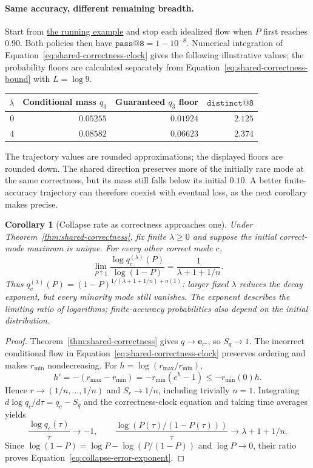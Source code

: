 \documentclass{article}
\newcommand{\1}{\mathbf 1}
\newtheorem{corollary}[lemma]{Corollary}
\theoremstyle{remark}
\theoremstyle{definition}
\theoremstyle{plain}
\begin{document}
\paragraph{Same accuracy, different remaining breadth.}
Start from \hyperref[ex:theory-running]{the running example} and stop each idealized flow when
$P$ first reaches $0.90$. Both policies then have
$\texttt{pass@8}=1-10^{-8}$. Numerical integration of
Equation~\eqref{eq:shared-correctness-clock} gives the following illustrative
values; the probability floors are calculated separately from
Equation~\eqref{eq:shared-correctness-bound} with $L=\log9$.
\begin{center}
\begin{tabular}{@{}rrrr@{}}
\toprule
$\lambda$ & Conditional mass $q_3$ & Guaranteed $q_3$ floor & $\texttt{distinct@8}$ \\
\midrule
$0$ & $0.05255$ & $0.01924$ & $2.125$ \\
$4$ & $0.08582$ & $0.06623$ & $2.374$ \\
\bottomrule
\end{tabular}
\end{center}
The trajectory values are rounded approximations; the displayed floors are
rounded down. The shared direction preserves more of the initially rare mode
at the same correctness, but its mass still falls below its initial $0.10$.
A better finite-accuracy trajectory can therefore coexist with eventual loss,
as the next corollary makes precise.

\begin{corollary}[Collapse rate as correctness approaches one]
\label{cor:collapse-error-rate}
Under Theorem~\ref{thm:shared-correctness}, fix finite $\lambda\ge0$
and suppose the initial correct-mode maximum is unique. For every other
correct mode $c$,
\begin{equation}
 \lim_{P\uparrow1}\frac{\log q_c^{(\lambda)}(P)}{\log(1-P)}
 =\frac{1}{\lambda+1+1/n}.
 \label{eq:collapse-error-exponent}
\end{equation}
Thus $q_c^{(\lambda)}(P)=(1-P)^{1/(\lambda+1+1/n)+o(1)}$:
larger fixed $\lambda$ reduces the decay exponent, but every minority mode
still vanishes. The exponent describes the limiting ratio of logarithms;
finite-accuracy probabilities also depend on the initial distribution.
\end{corollary}

\begin{proof}
Theorem~\ref{thm:shared-correctness} gives $q\to\mathbf e_{c^\star}$,
so $S_q\to1$. The incorrect conditional flow in
Equation~\eqref{eq:shared-correctness-clock} preserves ordering and makes
$r_{\min}$ nondecreasing. For $h=\log(r_{\max}/r_{\min})$,
\[
 h'=-(r_{\max}-r_{\min})
 =-r_{\min}(e^h-1)\le-r_{\min}(0)h.
\]
Hence $r\to(1/n,\ldots,1/n)$ and $S_r\to1/n$, including trivially $n=1$.
Integrating $d\log q_c/d\tau=q_c-S_q$ and the correctness-clock equation
and taking time averages yields
\[
 \frac{\log q_c(\tau)}{\tau}\to-1,
 \qquad
 \frac{\log(P(\tau)/(1-P(\tau)))}{\tau}
 \to\lambda+1+1/n.
\]
Since $\log(1-P)=\log P-\log(P/(1-P))$ and $\log P\to0$, their ratio proves
Equation~\eqref{eq:collapse-error-exponent}.
\end{proof}
\end{document}
